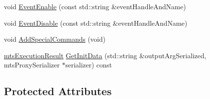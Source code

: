 \begin{DoxyCompactItemize}
void \hyperlink{classmts_socket_proxy_server_a15fb0f2b7b457e74434f618f7b3c1b0d}{Event\-Enable} (const std\-::string \&event\-Handle\-And\-Name)
\item 
void \hyperlink{classmts_socket_proxy_server_a026fc4300e258e82f622f72fd7af1e6e}{Event\-Disable} (const std\-::string \&event\-Handle\-And\-Name)
\item 
void \hyperlink{classmts_socket_proxy_server_ae1e5bf81532c293525cadac52bc7d169}{Add\-Special\-Commands} (void)
\item 
\hyperlink{classmts_execution_result}{mts\-Execution\-Result} \hyperlink{classmts_socket_proxy_server_a08aa6a4f76551b78546ae525bde4f325}{Get\-Init\-Data} (std\-::string \&output\-Arg\-Serialized, mts\-Proxy\-Serializer $\ast$serializer) const 
\end{DoxyCompactItemize}
\subsection*{Protected Attributes}
